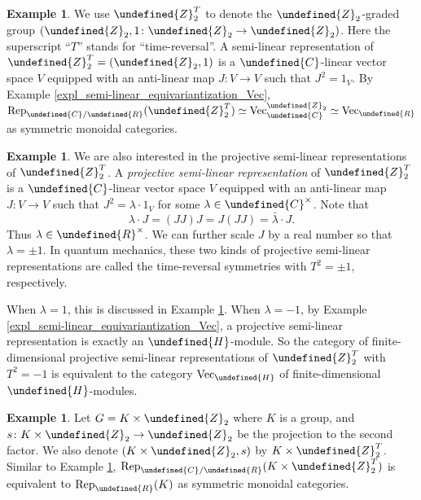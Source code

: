 \documentclass[10pt]{article}
\let\mathbb\undefined
\theoremstyle{definition}
\newtheorem{expl}[thm]{Example}
\numberwithin{equation}{section}
\numberwithin{thm}{section}
\newcommand{\Cb}{\mathbb{C}}
\newcommand{\Hb}{\mathbb{H}}
\newcommand{\Rb}{\mathbb{R}}
\newcommand{\Zb}{\mathbb{Z}}
\newcommand{\vect}{\mathrm{Vec}}
\newcommand{\rep}{\mathrm{Rep}}
\begin{document}
\begin{expl} \label{expl_Z2T_rep}
We use $\Zb_2^T$ to denote the $\Zb_2$-graded group $(\Zb_2,1 \colon \Zb_2 \to \Zb_2)$. Here the superscript ``$T$'' stands for ``time-reversal''. A semi-linear representation of $\Zb_2^T = (\Zb_2,1)$ is a $\Cb$-linear vector space $V$ equipped with an anti-linear map $J \colon V \to V$ such that $J^2 = 1_V$. By Example \ref{expl_semi-linear_equivariantization_Vec}, $\rep_{\Cb/\Rb}(\Zb_2^T) \simeq \vect_\Cb^{\Zb_2} \simeq \vect_\Rb$ as symmetric monoidal categories.
\end{expl}

\begin{expl} \label{expl_Z2T_projective_rep}
We are also interested in the projective semi-linear representations of $\Zb_2^T$. A \emph{projective semi-linear representation} of $\Zb_2^T$ is a $\Cb$-linear vector space $V$ equipped with an anti-linear map $J \colon V \to V$ such that $J^2 = \lambda \cdot 1_V$ for some $\lambda \in \Cb^\times$. Note that
\[
\lambda \cdot J = (JJ)J = J(JJ) = \bar{\lambda} \cdot J .
\]
Thus $\lambda \in \Rb^\times$. We can further scale $J$ by a real number so that $\lambda = \pm 1$. In quantum mechanics, these two kinds of projective semi-linear representations are called the time-reversal symmetries with $T^2 = \pm 1$, respectively.

When $\lambda = 1$, this is discussed in Example \ref{expl_Z2T_rep}. When $\lambda = -1$, by Example \ref{expl_semi-linear_equivariantization_Vec}, a projective semi-linear representation is exactly an $\Hb$-module. So the category of finite-dimensional projective semi-linear representations of $\Zb_2^T$ with $T^2 = -1$ is equivalent to the category $\vect_\Hb$ of finite-dimensional $\Hb$-modules.
\end{expl}

\begin{expl}
Let $G = K \times \Zb_2$ where $K$ is a group, and $s \colon K \times \Zb_2 \to \Zb_2$ be the projection to the second factor. We also denote $(K \times \Zb_2,s)$ by $K \times \Zb_2^T$. Similar to Example \ref{expl_Z2T_rep}, $\rep_{\Cb/\Rb}(K \times \Zb_2^T)$ is equivalent to $\rep_\Rb(K)$ as symmetric monoidal categories.
\end{expl}
\end{document}
